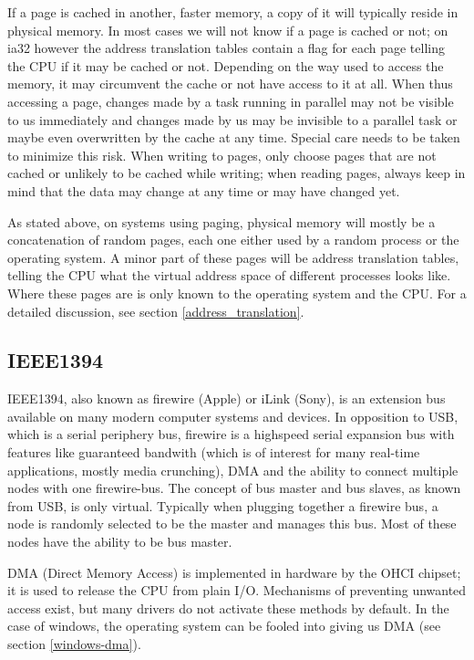If a page is cached in another, faster memory, a copy of it will typically
reside in physical memory. In most cases we will not know if a page is cached
or not; on ia32 however the address translation tables contain a flag for each
page telling the CPU if it may be cached or not. Depending on the way used to
access the memory, it may circumvent the cache or not have access to it at all.
When thus accessing a page, changes made by a task running in parallel may not
be visible to us immediately and changes made by us may be invisible to a
parallel task or maybe even overwritten by the cache at any time. Special care
needs to be taken to minimize this risk. When writing to pages, only choose
pages that are not cached or unlikely to be cached while writing; when reading
pages, always keep in mind that the data may change at any time or may have
changed yet.

As stated above, on systems using paging, physical memory will mostly be a
concatenation of random pages, each one either used by a random process or the
operating system. A minor part of these pages will be address translation
tables, telling the CPU what the virtual address space of different processes
looks like. Where these pages are is only known to the operating system and the
CPU.  For a detailed discussion, see section \ref{address_translation}.



\subsection{IEEE1394}

IEEE1394, also known as firewire (Apple) or iLink (Sony), is an extension bus
available on many modern computer systems and devices.  In opposition to USB,
which is a serial periphery bus, firewire is a highspeed serial expansion bus
with features like guaranteed bandwith (which is of interest for many real-time
applications, mostly media crunching), DMA and the ability to connect multiple
nodes with one firewire-bus. The concept of bus master and bus slaves, as known
from USB, is only virtual. Typically when plugging together a firewire bus, a
node is randomly selected to be the master and manages this bus. Most of these
nodes have the ability to be bus master.

DMA (Direct Memory Access) is implemented in hardware by the OHCI chipset; it
is used to release the CPU from plain I/O. Mechanisms of preventing unwanted
access exist, but many drivers do not activate these methods by default. In the
case of windows, the operating system can be fooled into giving us DMA (see
section \ref{windows-dma}).


